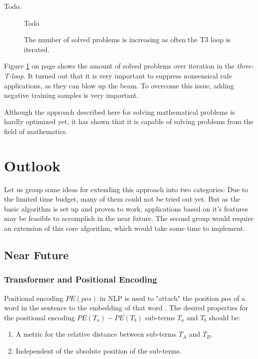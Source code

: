 \documentclass{scrartcl}
\theoremstyle{definition}
\begin{document}
Todo.

\begin{figure}[!htbp]
	\centering
	Todo
	\caption{The number of solved problems is increasing as often the T3 loop is iterated.}
	\label{fig:t3loop_performance}
\end{figure}

Figure \ref{fig:t3loop_performance} on page \pageref{fig:t3loop_performance} shows the amount of solved problems over iteration in the \textit{three-T-loop}. 
It turned out that it is very important to suppress nonsensical rule applications, as they can blow up the beam.
To overcome this issue, adding negative training samples is very important.

Although the approach described here for solving mathematical problems is hardly optimized yet,
it has shown that it is capable of solving problems from the field of mathematics.


\section{Outlook}

Let us group some ideas for extending this approach into two categories:
Due to the limited time budget, many of them could not be tried out yet.
But as the basic algorithm is set up and proven to work, applications based on it's features may be feasible to accomplish in the near future.
The second group would require an extension of this core algorithm, which would take some time to implement.

\subsection{Near Future}

\subsubsection{Transformer and Positional Encoding}

Positional encoding $PE\left( pos\right)$ in NLP is used to "attach" the position $pos$ of a word in the sentence to the embedding of that word \cite{vaswani2017attention}.
The desired properties for the positional encoding $PE\left( T_a \right) - PE\left( T_b \right)$ sub-terms $T_a$ and $T_b$ should be:
\begin{enumerate}[label=(\roman*)]
	\item A metric for the relative distance between sub-terms $T_A$ and $T_B$.
	\item Independent of the absolute position of the sub-terms.
\end{enumerate}
\end{document}
